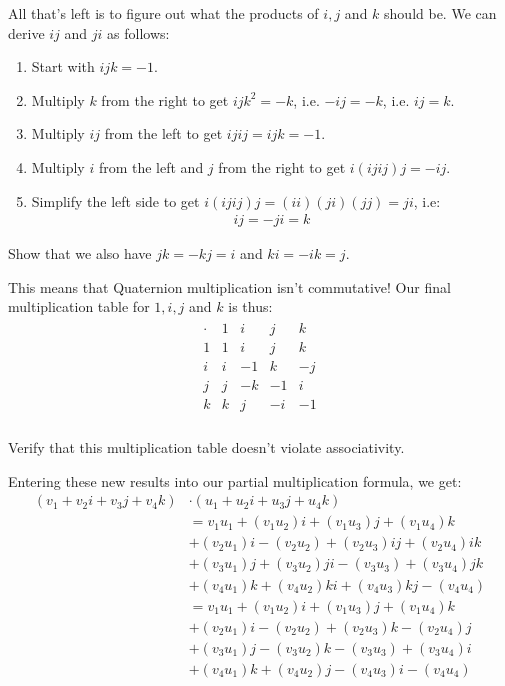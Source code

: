 All that's left is to figure out what the products of $i,j$ and $k$ should be.
\newpar
We can derive $ij$ and $ji$ as follows:
\begin{enumerate}
	\item Start with $ijk = -1$.
	\item Multiply $k$ from the right to get $ijk^2 = -k$, i.e. $-ij = -k$, i.e. $ij = k$.
	\item Multiply $ij$ from the left to get $ijij = ijk = -1$.
	\item Multiply $i$ from the left and $j$ from the right to get $i(ijij)j = -ij$.
	\item Simplify the left side to get $i(ijij)j = (ii)(ji)(jj) = ji$, i.e:
	\begin{align*}
		ij = -ji = k
	\end{align*}
\end{enumerate}
\begin{exercise}
	Show that we also have $jk = -kj = i$ and $ki = -ik = j$.
\end{exercise}
This means that Quaternion multiplication isn't commutative!
\newpar
Our final multiplication table for $1,i,j$ and $k$ is thus:
\begin{align*}
	\begin{array}{c|cccc}
		\cdot & 1 & i & j & k\\\hline
		1 & 1 & i & j & k\\
		i & i &-1 & k &-j\\
		j & j &-k &-1 & i\\
		k & k & j &-i &-1\\
	\end{array}
\end{align*}
\begin{exercise}
	Verify that this multiplication table doesn't violate associativity.
\end{exercise}
Entering these new results into our partial multiplication formula, we get:
\begin{align*}
	(v_1 + v_2i + v_3j + v_4k) &\cdot (u_1 + u_2i + u_3j + u_4k)\\
	&= 
	v_1u_1 + (v_1u_2)i + (v_1u_3)j + (v_1u_4)k\\
	&+ (v_2u_1)i - (v_2u_2) + (v_2u_3)ij + (v_2u_4)ik\\
	&+ (v_3u_1)j + (v_3u_2)ji - (v_3u_3) + (v_3u_4)jk\\
	&+ (v_4u_1)k + (v_4u_2)ki + (v_4u_3)kj - (v_4u_4)\\
	&=
	v_1u_1 + (v_1u_2)i + (v_1u_3)j + (v_1u_4)k\\
	&+ (v_2u_1)i - (v_2u_2) + (v_2u_3)k - (v_2u_4)j\\
	&+ (v_3u_1)j - (v_3u_2)k - (v_3u_3) + (v_3u_4)i\\
	&+ (v_4u_1)k + (v_4u_2)j - (v_4u_3)i - (v_4u_4)\\
\end{align*}
